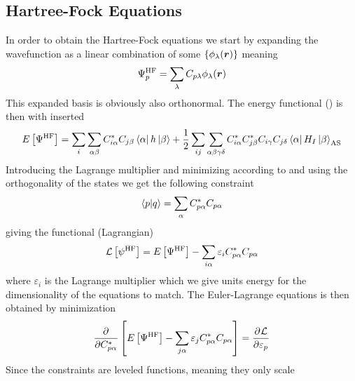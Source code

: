     \subsection{Hartree-Fock Equations}
        In order to obtain the Hartree-Fock equations we start by expanding the
        wavefunction as a linear combination of some  $\{\phi_{\lambda}(\boldsymbol{{r}})\}$ meaning
            \begin{equation}
                \Psi^{\text{HF}}_p = \sum_{\lambda}
                C_{p\lambda}\phi_{\lambda}(\boldsymbol{{r}})
                \label{eq:psiexpand}
            \end{equation}
        This expanded basis is obviously also orthonormal. The energy
        functional () is then with 
        inserted
            \begin{equation}
                E\left[\Psi^{\text{HF}}\right] = \sum_i\sum_{\alpha\beta}
                C^*_{i\alpha}C_{j\beta}\bra{\alpha}h\ket{\beta} + \frac{1}{2}
                \sum_{ij} \sum_{\alpha\beta\gamma\delta}
                C^{*}_{i\alpha}C^{*}_{j\beta}C_{i\gamma}C_{j\delta}
                \bra{\alpha}H_{I}\ket{\beta}_{\text{AS}}
            \end{equation}
        Introducing the Lagrange multiplier and minimizing according to
         and using the orthogonality of the
        states we get the following constraint
            \begin{equation}
                \braket{p}{q} = \sum_{\alpha} C^{*}_{p\alpha}C_{p\alpha}
            \end{equation}
        giving the functional (Lagrangian)
            \begin{equation}
                \mathcal{L}\left[\psi^{\text{HF}}\right] = E\left[\Psi^{\text{HF}}\right] -
                \sum_{i\alpha} \varepsilon_iC^{*}_{p\alpha}C_{p\alpha}
            \end{equation}
        where $\varepsilon_i$ is the Lagrange multiplier which we give units
        energy for the dimensionality of the equations to match. The
        Euler-Lagrange equations is then obtained by minimization
            \begin{equation}
                \prd{C^{*}_{p\alpha}} \left[\EHF - \sum_{j\alpha}
                \varepsilon_jC^{*}_{p\alpha}C_{p\alpha}\right] =
                \prd{\varepsilon_p}[\mathcal{L}]
                \label{eq:EulerLagrange1}
            \end{equation}
        Since the constraints are leveled functions, meaning they only scale

